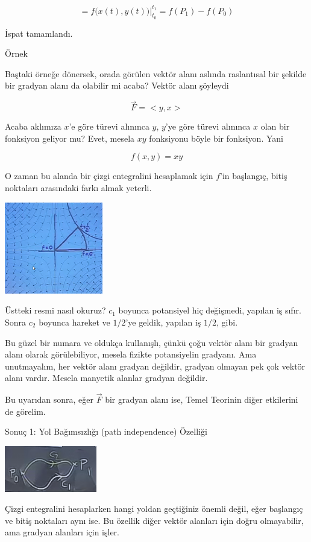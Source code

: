 \documentclass[12pt,fleqn]{article}\usepackage{../../common}
\begin{document}
$$
= f\bigg( x(t), y(t) \bigg) \bigg|_{t_0}^{t_1} = f(P_1) - f(P_0)
$$

İspat tamamlandı. 

Örnek

Baştaki örneğe dönersek, orada görülen vektör alanı aslında raslantısal bir
şekilde bir gradyan alanı da olabilir mi acaba? Vektör alanı şöyleydi

$$ \vec{F} = <y,x> $$

Acaba aklımıza $x$'e göre türevi alınınca $y$, $y$'ye göre türevi alınınca
$x$ olan bir fonksiyon geliyor mu? Evet, mesela $xy$ fonksiyonu böyle bir
fonksiyon. Yani

$$ f(x,y) = xy $$

O zaman bu alanda bir çizgi entegralini hesaplamak için $f$'in başlangıç,
bitiş noktaları arasındaki farkı almak yeterli. 

\includegraphics[height=4cm]{20_6.png}

Üstteki resmi nasıl okuruz? $c_1$ boyunca potansiyel hiç değişmedi, yapılan iş
sıfır. Sonra $c_2$ boyunca hareket ve $1/2$'ye geldik, yapılan iş $1/2$, gibi.

Bu güzel bir numara ve oldukça kullanışlı, çünkü çoğu vektör alanı bir
gradyan alanı olarak görülebiliyor, mesela fizikte potansiyelin
gradyanı. Ama unutmayalım, her vektör alanı gradyan değildir, gradyan
olmayan pek çok vektör alanı vardır. Mesela manyetik alanlar gradyan
değildir. 

Bu uyarıdan sonra, eğer $\vec{F}$ bir gradyan alanı ise, Temel Teorinin
diğer etkilerini de görelim. 

Sonuç 1: Yol Bağımsızlığı (path independence) Özelliği

\includegraphics[height=2cm]{20_7.png}

Çizgi entegralini hesaplarken hangi yoldan geçtiğiniz önemli değil, eğer
başlangıç ve bitiş noktaları aynı ise. Bu özellik diğer vektör alanları
için doğru olmayabilir, ama gradyan alanları için işler.
\end{document}
